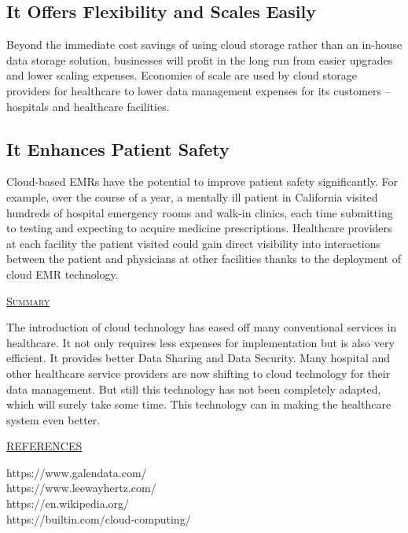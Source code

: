 \documentclass[12pt]{article}
\begin{document}
\subsection{It Offers Flexibility and Scales Easily}
Beyond the immediate cost savings of using cloud storage rather than an in-house data storage solution, businesses will profit in the long run from easier upgrades and lower scaling expenses. Economies of scale are used by cloud storage providers for healthcare to lower data management expenses for its customers – hospitals and healthcare facilities.

\subsection{It Enhances Patient Safety}
Cloud-based EMRs have the potential to improve patient safety significantly. For example, over the course of a year, a mentally ill patient in California visited hundreds of hospital emergency rooms and walk-in clinics, each time submitting to testing and expecting to acquire medicine prescriptions. Healthcare providers at each facility the patient visited could gain direct visibility into interactions between the patient and physicians at other facilities thanks to the deployment of cloud EMR technology.

\indent
\begin{center}
    \textsc{\huge\underline{Summary}}
\end{center}

\indent

The introduction of cloud technology has eased off many conventional services in healthcare. It not only requires less expenses for implementation but is also very efficient. It provides better Data Sharing and Data Security. Many hospital and other healthcare service providers are now shifting to cloud technology for their data management. But still this technology has not been completely adapted, which will surely take some time. This technology can in making the healthcare system even better.

\newpage
\begin{center}
    \textsc{\huge\underline{REFERENCES}}
\end{center}

\indent

https://www.galendata.com/ \\
https://www.leewayhertz.com/ \\
https://en.wikipedia.org/  \\
https://builtin.com/cloud-computing/ \\
\end{document}
